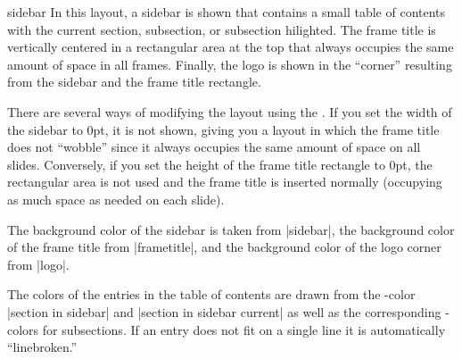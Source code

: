 \begin{outerthemeexample}{sidebar}
  In this layout, a sidebar is shown that contains a small table of
  contents with the current section, subsection, or subsection hilighted. The
  frame title is vertically centered in a rectangular area at the top
  that always occupies the same amount of space in all
  frames. Finally, the logo is shown in the ``corner'' resulting from
  the sidebar and the frame title rectangle.

  There are several ways of modifying the layout using the
  . If you set the width of the sidebar to 0pt, it is
  not shown, giving you a layout in which the frame title does not
  ``wobble'' since it always occupies the same amount of space on all
  slides. Conversely, if you set the height of the frame title
  rectangle to 0pt, the rectangular area is not used and the frame
  title is inserted normally (occupying as much space as needed on
  each slide).

  The background color of the sidebar is taken from |sidebar|, the
  background color of the frame title from |frametitle|, and the
  background color of the logo corner from |logo|.

  The colors of the entries in the table of contents are drawn from
  the \beamer-color |section in sidebar| and |section in sidebar current| as well as the
  corresponding \beamer-colors for subsections. If an entry does not
  fit on a single line it is automatically ``linebroken.''


\end{outerthemeexample}

